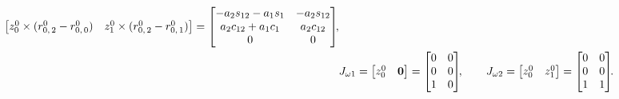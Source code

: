 \begin{align}
\begin{bmatrix}
        z^0_0 \times (r^0_{0,\,2} - r^0_{0,\,0}) & z^0_1 \times (r^0_{0,\,2} - r^0_{0,\,1})
    \end{bmatrix}
    =
    \begin{bmatrix}
        -a_2 s_{12} - a_1 s_1 & -a_2 s_{12} \\
        a_2 c_{12} + a_1 c_1 & a_2 c_{12} \\
        0 & 0
    \end{bmatrix}\!\!,
    \\
    & J_{\omega1} =
    \begin{bmatrix}
        z^0_0 & \mathbf{0}
    \end{bmatrix}
    =
    \begin{bmatrix}
        0 & 0 \\
        0 & 0 \\
        1 & 0
    \end{bmatrix}\!\!,
    \qquad
    J_{\omega2} =
    \begin{bmatrix}
        z^0_0 & z^0_1
    \end{bmatrix}
    =
    \begin{bmatrix}
        0 & 0 \\
        0 & 0 \\
        1 & 1
    \end{bmatrix}\!\!\ldotp
\end{align}
